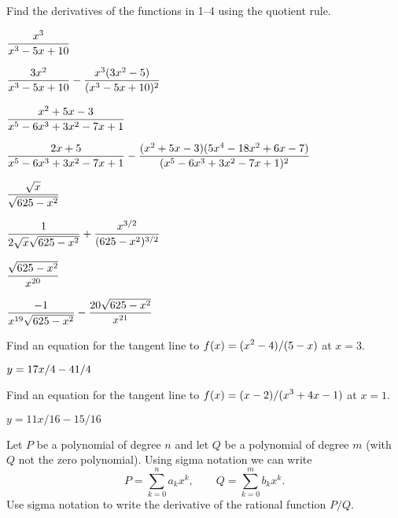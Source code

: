 \begin{exercises}

Find the derivatives of the functions in 1--4
using the quotient rule.

\twocol

\begin{exercise} $\displaystyle {x^3\over x^3-5x+10}$
\begin{answer} $\displaystyle {3x^2\over x^3-5x+10}-{x^3(3x^2-5)\over (x^3-5x+10)^2}$
\end{answer}\end{exercise}

\begin{exercise} $\displaystyle {x^2+5x-3\over x^5-6x^3+3x^2-7x+1}$
\begin{answer} $\displaystyle {2x+5\over x^5-6x^3+3x^2-7x+1}-
{(x^2+5x-3)(5x^4-18x^2+6x-7)\over(x^5-6x^3+3x^2-7x+1)^2}$
\end{answer}\end{exercise}

\ssk
\begin{exercise} $\displaystyle {\sqrt{x}\over\sqrt{625-x^2}}$
\begin{answer} $\displaystyle {1\over 2\sqrt{x}\sqrt{625-x^2}}+{x^{3/2}\over(625-x^2)^{3/2}}$
\end{answer}\end{exercise}

\begin{exercise} $\displaystyle {\sqrt{625-x^2}\over x^{20}}$
\begin{answer} $\displaystyle {-1\over x^{19}\sqrt{625-x^2}}-{20\sqrt{625-x^2}\over x^{21}}$
\end{answer}\end{exercise}

\endtwocol
\bsk

\begin{exercise} Find an equation for the tangent line to $\displaystyle f(x) = (x^2 -
4)/(5-x)$ at $x= 3$.  
\begin{answer} $\displaystyle y=17x/4-41/4$ 
\end{answer}\end{exercise}

\begin{exercise}  Find an equation for the tangent line to 
$\displaystyle f(x) = (x-2)/(x^3 + 4x - 1)$ at $x=1$.
\begin{answer} $y=11x/16-15/16$
\end{answer}\end{exercise}

\begin{exercise} Let $P$ be a polynomial of degree $n$ and let $Q$ be a
polynomial of degree $m$ (with $Q$ not the zero polynomial). 
Using sigma notation we can write
$$P=\sum _{k=0 } ^n a_k x^k,\qquad
Q=\sum_{k=0}^m b_k x^k.
$$
Use sigma notation to write the derivative of the 
{\dfont rational function\/}
$P/Q$.
\end{exercise}


\end{exercises}
